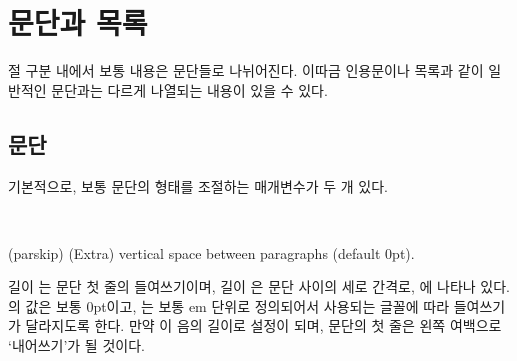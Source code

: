 \chapter{문단과 목록}


절 구분 내에서 보통 내용은 문단들로 나뉘어진다.
이따금 인용문이나 목록과 같이 일반적인 문단과는 다르게
나열되는 내용이 있을 수 있다.

\section{문단}


기본적으로, 보통 문단의 형태를 조절하는 매개변수가 두 개 있다.

\begin{syntax}
\lnc{\parindent} \lnc{\parskip} \\
\end{syntax}
\glossary(parskip)%
  {}%
  {(Extra) vertical space between paragraphs (default 0pt).}
 
길이 \lnc{\parindent}는 문단 첫 줄의
들여쓰기이며, 길이 \lnc{\parskip}은 문단 사이의 세로 간격로, 에
나타나 있다.
\lnc{\parskip}의 값은 보통 0pt이고, \lnc{\parindent}는 보통 em 단위로
정의되어서 사용되는 글꼴에 따라 들여쓰기가 달라지도록 한다.
만약 \lnc{\parindent}이 음의 길이로 설정이 되며, 문단의 첫 줄은 왼쪽
여백으로
`내어쓰기'가 될 것이다.

